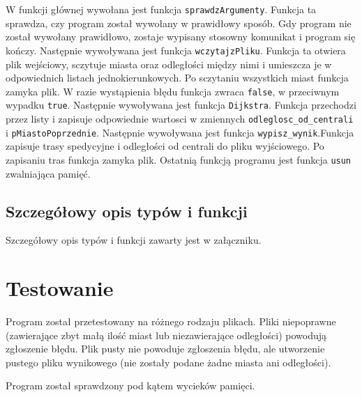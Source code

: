 \documentclass[12pt,a4paper,twoside]{article}
\begin{document}
W funkcji głównej wywołana jest funkcja \lstinline|sprawdzArgumenty|.
Funkcja ta sprawdza, czy program został wywołany w prawidłowy sposób. Gdy program nie został wywołany prawidłowo, zostaje wypisany stosowny komunikat i program się kończy.
Następnie wywoływana jest funkcja \lstinline|wczytajzPliku|.
Funkcja ta otwiera plik wejściowy, sczytuje miasta oraz odległości między nimi i umieszcza je w odpowiednich listach jednokierunkowych.
Po sczytaniu wszystkich miast funkcja zamyka plik.
W razie wystąpienia błędu funkcja zwraca \lstinline!false!, w przeciwnym wypadku \lstinline!true!.
Następnie wywoływana jest funkcja \lstinline|Dijkstra|.
Funkcja przechodzi przez listy i zapisuje odpowiednie wartosci w zmiennych \lstinline!odleglosc_od_centrali! i \lstinline!pMiastoPoprzednie!.
Następnie wywoływana jest funkcja \lstinline|wypisz_wynik|.Funkcja zapisuje trasy spedycyjne i odległości od centrali do pliku wyjściowego. Po zapisaniu tras funkcja zamyka plik.
Ostatnią funkcją programu jest funkcja \lstinline|usun| zwalniająca pamięć.


\subsection{Szczegółowy opis typów i funkcji}

Szczegółowy opis typów i funkcji zawarty jest w załączniku.

 

\section{Testowanie}

Program został przetestowany na różnego rodzaju plikach. Pliki niepoprawne (zawierające zbyt małą ilość miast lub niezawierające odległości) powodują zgłoszenie błędu. Plik pusty nie powoduje zgłoszenia błędu, ale utworzenie pustego pliku wynikowego (nie zostały podane żadne miasta ani odległości). 

Program został sprawdzony pod kątem wycieków pamięci.

%
\end{document}
